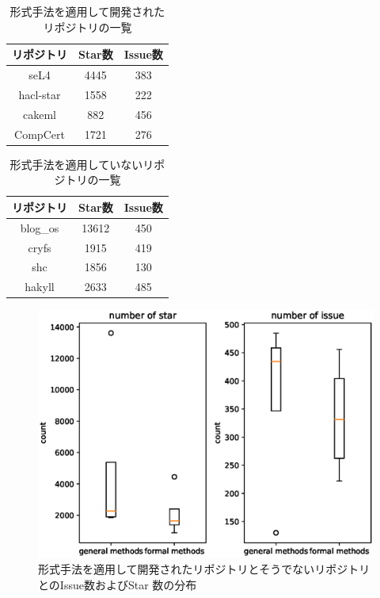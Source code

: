 \documentclass[main]{subfiles}
\begin{document}

\begin{table}[p]
	\centering
	\caption{形式手法を適用して開発されたリポジトリの一覧}
	\label{tab:repository_formal}
	\begin{tabular}{ccc} %
		\hline
		リポジトリ & Star数 & Issue数 \\\hline
		seL4       & 4445   & 383     \\
		hacl-star  & 1558   & 222     \\
		cakeml     & 882    & 456     \\
		CompCert   & 1721   & 276     \\\hline
	\end{tabular}
\end{table}

\begin{table}[p]
	\centering
	\caption{形式手法を適用していないリポジトリの一覧}
	\label{tab:repository_common}
	\begin{tabular}{ccc} %
		\hline
		リポジトリ & Star数 & Issue数 \\\hline
		blog\_os   & 13612  & 450     \\
		cryfs      & 1915   & 419     \\
		shc        & 1856   & 130     \\
		hakyll     & 2633   & 485     \\\hline
	\end{tabular}
\end{table}


\begin{figure}[p]
	\centering
	\includegraphics[width=\hsize]{figures/boxplot.eps}
	\caption{形式手法を適用して開発されたリポジトリとそうでないリポジトリとのIssue数およびStar
	数の分布}
	\label{fig:boxplot}
\end{figure}

\end{document}
